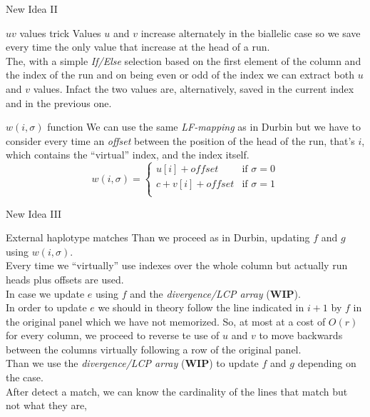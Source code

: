 \documentclass{beamer}
\begin{document}
\begin{frame}{New Idea II}
  \begin{block}{$uv$ values trick}
    Values $u$ and $v$ increase alternately in the biallelic case so we save
    every time the only value that increase at the head of a run.\\
    The, with a simple \textit{If/Else} selection based on the first element of
    the column and the index of the run and on being even or odd of the index we
    can extract both $u$ and $v$ values. Infact the two values are,
    alternatively, saved in the current index and in the previous one.
  \end{block}
   \begin{block}{$w(i,\sigma)$ function}
    We can use the same \textit{LF-mapping} as in Durbin but we have to consider
    every time an \textit{offset} between the position of the head of the run,
    that's $i$, which contains the ``virtual'' index, and the index itself.
    \[w(i,\sigma)=
      \begin{cases}
        u[i]+offset&\mbox{if } \sigma=0\\
        c+v[i]+offset&\mbox{if } \sigma=1\\
      \end{cases}
    \]
  \end{block}
\end{frame}
\begin{frame}{New Idea III}
  \begin{block}{External haplotype matches}
    Than we proceed as in Durbin, updating $f$ and $g$ using $w(i,\sigma)$.\\
    Every time we ``virtually'' use indexes over the whole column but actually
    run heads plus offsets are used. \\
    In case we update $e$ using $f$ and the \textit{divergence/LCP array}
    (\textbf{WIP}).\\
    In order to update $e$ we should in theory follow the line indicated in $i +
    1$ by $f$ in the original panel which we have not memorized. So, at most at
    a cost of $O(r)$ for every column, we proceed to reverse te use of $u$ and
    $v$ to move backwards between the columns virtually following a row of the
    original panel.\\
    Than we use the \textit{divergence/LCP array} (\textbf{WIP}) to update
    $f$ 
    and $g$ depending on the case.\\
    After detect a match, we can know the cardinality of the lines that match
    but not what they are, 
  \end{block}
\end{frame}
\end{document}
